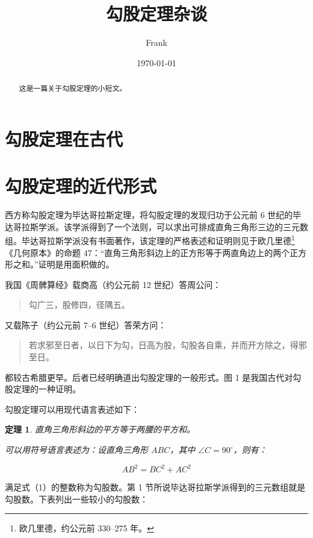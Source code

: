 \documentclass[UTF8]{ctexart}
\title{勾股定理杂谈}
\author{Frank}
\date{\today}
\begin{document}
\maketitle
\begin{abstract}
    这是一篇关于勾股定理的小短文。
\end{abstract}
\tableofcontents
\section{勾股定理在古代}
\section{勾股定理的近代形式}


西方称勾股定理为毕达哥拉斯定理，将勾股定理的发现归功于公元前 6 世纪的毕达哥拉斯学派。该学派得到了一个法则，可以求出可排成直角三角形三边的三元数组。毕达哥拉斯学派没有书面著作，该定理的严格表述和证明则见于欧几里德\footnote{欧几里德，约公元前 330--275 年。}《几何原本》的命题 47：“直角三角形斜边上的正方形等于两直角边上的两个正方形之和。”证明是用面积做的。

我国《周髀算经》载商高（约公元前 12 世纪）答周公问：

\begin{quote}
    \kaishu 勾广三，股修四，径隅五。
\end{quote}

又载陈子（约公元前 7--6 世纪）答荣方问：

\begin{quote}
    \kaishu 若求邪至日者，以日下为勾，日高为股，勾股各自乘，并而开方除之，得邪至日。
\end{quote}

都较古希腊更早。后者已经明确道出勾股定理的一般形式。图 1 是我国古代对勾股定理的一种证明。

勾股定理可以用现代语言表述如下：

\newtheorem{thm}{定理}
\begin{thm}
    直角三角形斜边的平方等于两腰的平方和。

    可以用符号语言表述为：设直角三角形 $ABC$，其中 $\angle C = 90^{\circ}$，则有：

    \begin{equation}
        AB^2 = BC^2 + AC^2
    \end{equation}
\end{thm}

满足式（1）的整数称为勾股数。第 1 节所说毕达哥拉斯学派得到的三元数组就是勾股数。下表列出一些较小的勾股数：
\end{document}
